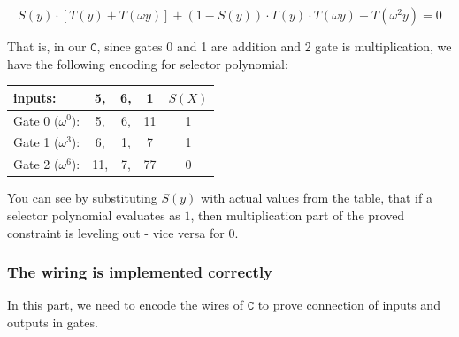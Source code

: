 \documentclass[../lecture-notes.tex]{subfiles}
\begin{document}
\[S(y) \cdot [T(y) + T(\omega y)] + (1 - S(y)) \cdot T(y) \cdot T(\omega y) - T(\omega^2 y) = 0\]

\begin{example}

That is, in our \(\texttt{C}\), since gates 0 and 1 are addition and 2 gate is multiplication, we have the following encoding for selector polynomial:

\begin{center}
\begin{tabular}{l ccc | c}
  inputs: & 5, & 6, & 1 & $S(X)$ \\ \hline
  Gate 0 ($\omega^0$): & 5, & 6, & 11 & 1 \\
  Gate 1 ($\omega^3$): & 6, & 1, & 7 & 1 \\
  Gate 2 ($\omega^6$): & 11, & 7, & 77 & 0 \\ 
\end{tabular}
\end{center}

You can see by substituting \(S(y)\) with actual values from the table, that if a selector polynomial evaluates as \(1\), then multiplication part of the proved constraint is leveling out - vice versa for \(0\).

\end{example}

\subsubsection{The wiring is implemented correctly}
In this part, we need to encode the wires of \(\texttt{C}\) to prove connection of inputs and outputs in gates. 
\end{document}
